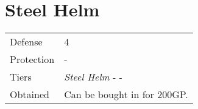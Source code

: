 \section{Steel Helm}
\label{armor:steel_helm}


\noindent\begin{tabularx}{\textwidth}[l]{lX}
	Defense
	& 4
\\
	Protection
	& -
\\
	Tiers
	& \textit{Steel Helm} - \nameref{armor:moon_helm} - \nameref{armor:apollo_helm}
\\
	Obtained
	& Can be bought in \nameref{map:aquaria} for 200GP.
\end{tabularx}
